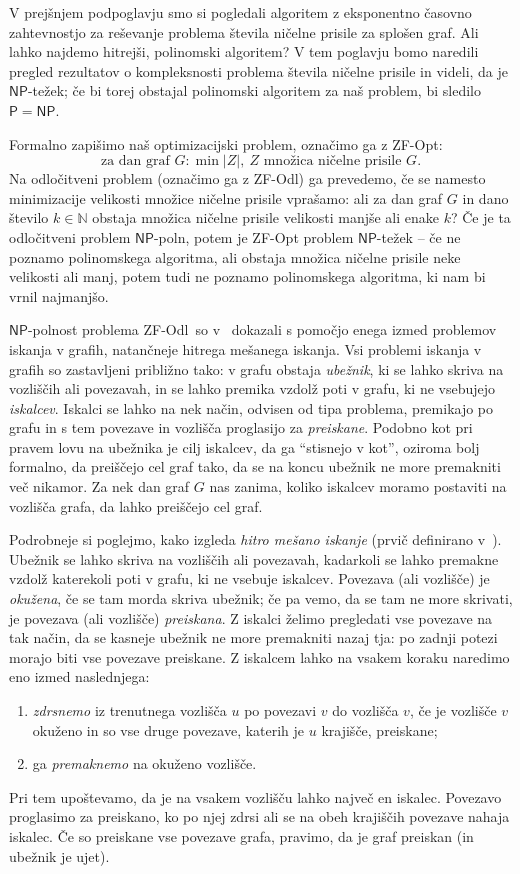 \documentclass[12pt,a4paper,twoside]{article}
\theoremstyle{definition} %
\theoremstyle{plain} %
\numberwithin{equation}{section}  %
\newcommand{\N}{\mathbb N}
\renewcommand{\P}{\ensuremath{\mathsf{P}}}
\newcommand{\NP}{\ensuremath{\mathsf{NP}}}
\newcommand{\ZFOdl}{\textsf{ZF-Odl}}
\begin{document}
V prejšnjem podpoglavju smo si pogledali algoritem z eksponentno časovno zahtevnostjo za reševanje problema števila ničelne prisile za splošen graf. Ali lahko najdemo hitrejši, polinomski algoritem? V tem poglavju bomo naredili pregled rezultatov o kompleksnosti problema števila ničelne prisile in videli, da je $\NP$-težek; če bi torej obstajal polinomski algoritem za naš problem, bi sledilo $\P = \NP$. 

Formalno zapišimo naš optimizacijski problem, označimo ga z \textsf{ZF-Opt}:
\[ \text{za dan graf } G\colon \min |Z|,\ Z \text{ množica ničelne prisile } G .\]
Na odločitveni problem (označimo ga z \ZFOdl) ga prevedemo, če se namesto minimizacije velikosti množice ničelne prisile vprašamo: ali za dan graf $G$ in dano število $k \in \N$ obstaja množica ničelne prisile velikosti manjše ali enake $k$? Če je ta odločitveni problem $\NP$-poln, potem je \textsf{ZF-Opt} problem $\NP$-težek -- če ne poznamo polinomskega algoritma, ali obstaja množica ničelne prisile neke velikosti ali manj, potem tudi ne poznamo polinomskega algoritma, ki nam bi vrnil najmanjšo. 

$\NP$-polnost problema \ZFOdl\ so v~\cite{fallat2016complexity} dokazali s pomočjo enega izmed problemov iskanja v grafih, natančneje hitrega mešanega iskanja. Vsi problemi iskanja v grafih so zastavljeni približno tako: v grafu obstaja \emph{ubežnik}, ki se lahko skriva na vozliščih ali povezavah, in se lahko premika vzdolž poti v grafu, ki ne vsebujejo \emph{iskalcev}. Iskalci se lahko na nek način, odvisen od tipa problema, premikajo po grafu in s tem povezave in vozlišča proglasijo za \emph{preiskane}. Podobno kot pri pravem lovu na ubežnika je cilj iskalcev, da ga ``stisnejo v kot'', oziroma bolj formalno, da preiščejo cel graf tako, da se na koncu ubežnik ne more premakniti več nikamor. Za nek dan graf $G$ nas zanima, koliko iskalcev moramo postaviti na vozlišča grafa, da lahko preiščejo cel graf. 

Podrobneje si poglejmo, kako izgleda \emph{hitro mešano iskanje} (prvič definirano v~\cite{yang2013fast}). Ubežnik se lahko skriva na vozliščih ali povezavah, kadarkoli se lahko premakne vzdolž katerekoli poti v grafu, ki ne vsebuje iskalcev. Povezava (ali vozlišče) je \emph{okužena}, če se tam morda skriva ubežnik; če pa vemo, da se tam ne more skrivati, je povezava (ali vozlišče) \emph{preiskana}. Z iskalci želimo pregledati vse povezave na tak način, da se kasneje ubežnik ne more premakniti nazaj tja: po zadnji potezi morajo biti vse povezave preiskane. Z iskalcem lahko na vsakem koraku naredimo eno izmed naslednjega:
\begin{enumerate}
    \item \emph{zdrsnemo} iz trenutnega vozlišča $u$ po povezavi $v$ do vozlišča $v$, če je vozlišče $v$ okuženo in so vse druge povezave, katerih je $u$ krajišče, preiskane;
    \item ga \emph{premaknemo} na okuženo vozlišče.
\end{enumerate}
Pri tem upoštevamo, da je na vsakem vozlišču lahko največ en iskalec. Povezavo proglasimo za preiskano, ko po njej zdrsi ali se na obeh krajiščih povezave nahaja iskalec. Če so preiskane vse povezave grafa, pravimo, da je graf preiskan (in ubežnik je ujet).
\end{document}

